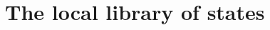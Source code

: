 \documentclass[11pt,twoside]{report}
\begin{document}

\section{The local library of states}
\label{sec:local-library}
\end{document}
